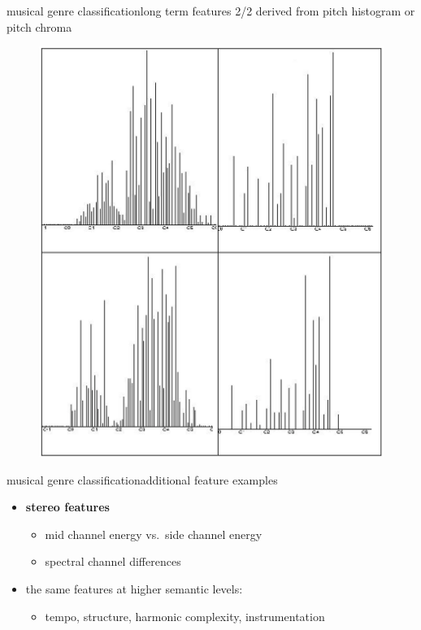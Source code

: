         \begin{frame}{musical genre classification}{long term features 2/2}
            derived from pitch histogram or pitch chroma
            \begin{figure}
                \centering
                \includegraphics[scale=.12]{graph/genre_pitchhisto}
            \end{figure}
        \end{frame}
        \begin{frame}{musical genre classification}{additional feature examples}
            \begin{itemize}
                \item	\textbf{stereo features}
                    \begin{itemize}
                        \item	mid channel energy vs.\ side channel energy
                        \item	spectral channel differences
                    \end{itemize}
                \item	the same features at higher semantic levels:
                    \begin{itemize}
                        \item   tempo, structure, harmonic complexity, instrumentation
                    \end{itemize}
            \end{itemize}
        \end{frame}

